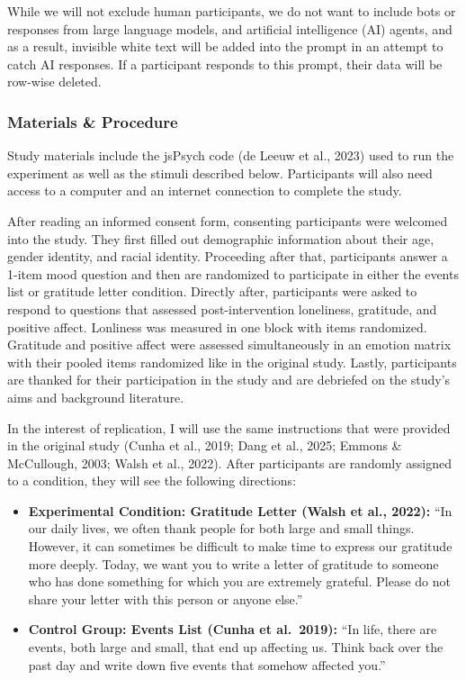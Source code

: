 \documentclass[
  letterpaper,
  DIV=11,
  numbers=noendperiod]{scrartcl}
\providecommand{\tightlist}{%
  \setlength{\itemsep}{0pt}\setlength{\parskip}{0pt}}
\begin{document}
While we will not exclude human participants, we do not want to include
bots or responses from large language models, and artificial
intelligence (AI) agents, and as a result, invisible white text will be
added into the prompt in an attempt to catch AI responses. If a
participant responds to this prompt, their data will be row-wise
deleted.

\subsubsection{Materials \& Procedure}\label{materials-procedure}

Study materials include the jsPsych code (de Leeuw et al., 2023) used to
run the experiment as well as the stimuli described below. Participants
will also need access to a computer and an internet connection to
complete the study.

After reading an informed consent form, consenting participants were
welcomed into the study. They first filled out demographic information
about their age, gender identity, and racial identity. Proceeding after
that, participants answer a 1-item mood question and then are randomized
to participate in either the events list or gratitude letter condition.
Directly after, participants were asked to respond to questions that
assessed post-intervention loneliness, gratitude, and positive affect.
Lonliness was measured in one block with items randomized. Gratitude and
positive affect were assessed simultaneously in an emotion matrix with
their pooled items randomized like in the original study. Lastly,
participants are thanked for their participation in the study and are
debriefed on the study's aims and background literature.

In the interest of replication, I will use the same instructions that
were provided in the original study (Cunha et al., 2019; Dang et al.,
2025; Emmons \& McCullough, 2003; Walsh et al., 2022). After
participants are randomly assigned to a condition, they will see the
following directions:

\begin{itemize}
\tightlist
\item
  \textbf{Experimental Condition: Gratitude Letter (Walsh et al.,
  2022):} ``In our daily lives, we often thank people for both large and
  small things. However, it can sometimes be difficult to make time to
  express our gratitude more deeply. Today, we want you to write a
  letter of gratitude to someone who has done something for which you
  are extremely grateful. Please do not share your letter with this
  person or anyone else.''
\item
  \textbf{Control Group: Events List (Cunha et al.~2019):} ``In life,
  there are events, both large and small, that end up affecting us.
  Think back over the past day and write down five events that somehow
  affected you.''
\end{itemize}
\end{document}
